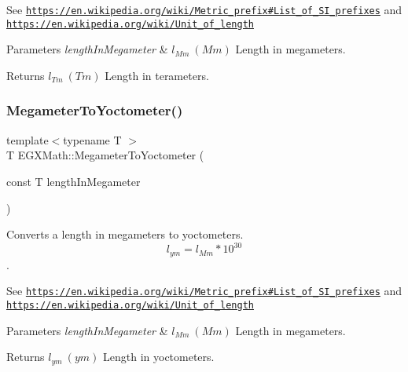 See \href{https://en.wikipedia.org/wiki/Metric_prefix#List_of_SI_prefixes}{\tt https\+://en.\+wikipedia.\+org/wiki/\+Metric\+\_\+prefix\#\+List\+\_\+of\+\_\+\+S\+I\+\_\+prefixes} and \href{https://en.wikipedia.org/wiki/Unit_of_length}{\tt https\+://en.\+wikipedia.\+org/wiki/\+Unit\+\_\+of\+\_\+length} 
\begin{DoxyParams}{Parameters}
{\em length\+In\+Megameter} & $ l_{Mm}\ (Mm)$ Length in megameters. \\
\hline
\end{DoxyParams}
\begin{DoxyReturn}{Returns}
$ l_{Tm}\ (Tm)$ Length in terameters. 
\end{DoxyReturn}
\mbox{\label{group___e_g_x_math-_conversions-_length_conversions-_megameter-_s_i_gac9b71989abb5a622818f01c5bdbe7285}} 
\subsubsection{\texorpdfstring{Megameter\+To\+Yoctometer()}{MegameterToYoctometer()}}
{\footnotesize\ttfamily template$<$typename T $>$ \\
T E\+G\+X\+Math\+::\+Megameter\+To\+Yoctometer (\begin{DoxyParamCaption}\item[{const T}]{length\+In\+Megameter }\end{DoxyParamCaption})}



Converts a length in megameters to yoctometers. \[ l_{ym}=l_{Mm} * 10^{30} \]. 

See \href{https://en.wikipedia.org/wiki/Metric_prefix#List_of_SI_prefixes}{\tt https\+://en.\+wikipedia.\+org/wiki/\+Metric\+\_\+prefix\#\+List\+\_\+of\+\_\+\+S\+I\+\_\+prefixes} and \href{https://en.wikipedia.org/wiki/Unit_of_length}{\tt https\+://en.\+wikipedia.\+org/wiki/\+Unit\+\_\+of\+\_\+length} 
\begin{DoxyParams}{Parameters}
{\em length\+In\+Megameter} & $ l_{Mm}\ (Mm)$ Length in megameters. \\
\hline
\end{DoxyParams}
\begin{DoxyReturn}{Returns}
$ l_{ym}\ (ym)$ Length in yoctometers. 
\end{DoxyReturn}
\mbox{\label{group___e_g_x_math-_conversions-_length_conversions-_megameter-_s_i_ga3d729dabc7c37d927c02cf4ae0c560d4}} 
